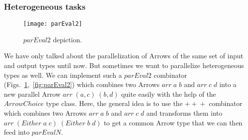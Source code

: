 \documentclass{jfp1}
\newcommand{\Conid}[1]{\mathit{#1}}
\newcommand{\Varid}[1]{\mathit{#1}}
\begin{document}
\subsubsection{Heterogeneous tasks}
\begin{figure}[tb]
	\texttt{[image: parEval2]}
	\caption{\ensuremath{\Varid{parEval2}} depiction.}
	\label{fig:parEval2Img}
\end{figure}
We have only talked about the parallelization of Arrows of the same set of input and output types until now. But sometimes we want to parallelize heterogeneous types as well. We can implement such a \ensuremath{\Varid{parEval2}} combinator (Figs.~\ref{fig:parEval2Img},~\ref{fig:parEval2}) which combines two Arrows \ensuremath{\Varid{arr}\;\Varid{a}\;\Varid{b}} and \ensuremath{\Varid{arr}\;\Varid{c}\;\Varid{d}} into a new parallel Arrow \ensuremath{\Varid{arr}\;(\Varid{a},\Varid{c})\;(\Varid{b},\Varid{d})} quite easily with the help of the \ensuremath{\Conid{ArrowChoice}} type class. Here, the general idea is to use the \ensuremath{\mathbin{+\!\!+\!\!+}} combinator which combines two Arrows \ensuremath{\Varid{arr}\;\Varid{a}\;\Varid{b}} and \ensuremath{\Varid{arr}\;\Varid{c}\;\Varid{d}} and transforms them into \ensuremath{\Varid{arr}\;(\Conid{Either}\;\Varid{a}\;\Varid{c})\;(\Conid{Either}\;\Varid{b}\;\Varid{d})} to get a common Arrow type that we can then feed into \ensuremath{\Varid{parEvalN}}.

\end{document}
